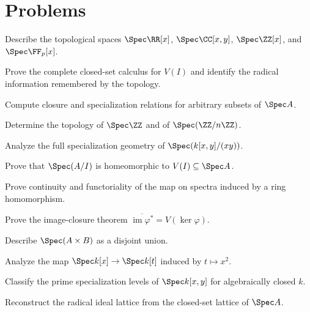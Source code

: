 \section{Problems}
\ifdefined\FullProblemDossiers

\else
\begin{problem}Describe the topological spaces $\Spec\RR[x]$, $\Spec\CC[x,y]$, $\Spec\ZZ[x]$, and $\Spec\FF_p[x]$.\end{problem}
\begin{problem}Prove the complete closed-set calculus for $V(I)$ and identify the radical information remembered by the topology.\end{problem}
\begin{problem}Compute closure and specialization relations for arbitrary subsets of $\Spec A$.\end{problem}
\begin{problem}Determine the topology of $\Spec\ZZ$ and of $\Spec(\ZZ/n\ZZ)$.\end{problem}
\begin{problem}Analyze the full specialization geometry of $\Spec(k[x,y]/(xy))$.\end{problem}
\begin{problem}Prove that $\Spec(A/I)$ is homeomorphic to $V(I)\subseteq\Spec A$.\end{problem}
\begin{problem}Prove continuity and functoriality of the map on spectra induced by a ring homomorphism.\end{problem}
\begin{problem}Prove the image-closure theorem $\overline{\operatorname{im}\varphi^\ast}=V(\ker\varphi)$.\end{problem}
\begin{problem}Describe $\Spec(A\times B)$ as a disjoint union.\end{problem}
\begin{problem}Analyze the map $\Spec k[x]\to\Spec k[t]$ induced by $t\mapsto x^2$.\end{problem}
\begin{problem}Classify the prime specialization levels of $\Spec k[x,y]$ for algebraically closed $k$.\end{problem}
\begin{problem}Reconstruct the radical ideal lattice from the closed-set lattice of $\Spec A$.\end{problem}
\fi

